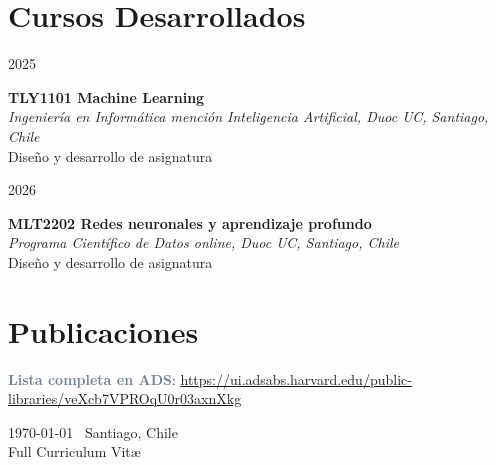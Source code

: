 \documentclass[10pt, a4paper]{article}
\newlength{\datebox}
\newlength{\textbox}
\newcommand{\workitem}[4]{\noindent\parbox[t]{\datebox}{#1}%
    \parbox[t]{\textbox}{\textbf{\textcolor{ViridianGreen}{#2}}\\
    \textit{#3}\\\textcolor{Jet}{\small #4}}\par\vspace{0.4cm}}
\newcommand{\skillitem}[2]{\noindent\textbf{\textcolor{SlateGray}{#1}}: #2\par\vspace{0.2cm}}
\begin{document}
\section*{Cursos Desarrollados}
\workitem{2025}{TLY1101 Machine Learning}{Ingeniería en Informática mención Inteligencia Artificial, Duoc UC, Santiago, Chile}{Diseño y desarrollo de asignatura}
\workitem{2026}{MLT2202 Redes neuronales y aprendizaje profundo}{Programa Científico de Datos online, Duoc UC, Santiago, Chile}{Diseño y desarrollo de asignatura}

\section*{Publicaciones}
\skillitem{Lista completa en ADS}{\url{https://ui.adsabs.harvard.edu/public-libraries/veXcb7VPROqU0r03axnXkg}}

\nocite{*}
\printbibliography[heading=none]

\vspace{1cm}
\begin{center}
{\small \today\- \-\ Santiago, Chile}\\
{\scriptsize Full Curriculum Vit\ae}
\end{center}
\end{document}

